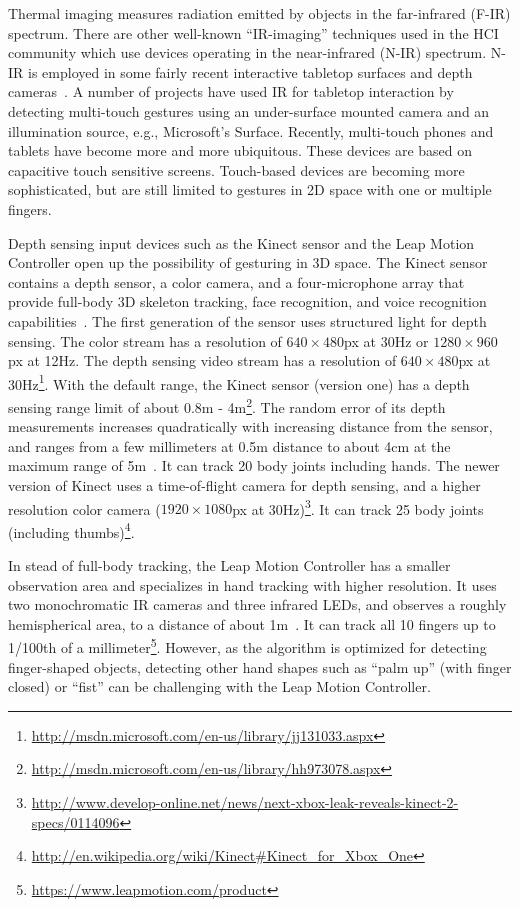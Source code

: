 Thermal imaging measures radiation emitted by objects in the
far-infrared (F-IR) spectrum. There are other well-known ``IR-imaging''
techniques used in the HCI community which use devices operating in the
near-infrared (N-IR) spectrum.
N-IR is employed in some fairly recent interactive tabletop surfaces and depth
cameras~\cite{izadi08, zhang12}. A number of projects have used
IR for tabletop interaction by detecting multi-touch gestures using an
under-surface mounted camera and an illumination source, e.g.,
Microsoft's Surface. Recently, multi-touch phones and tablets have become more
and more ubiquitous. These devices are based on capacitive touch sensitive screens. Touch-based devices are
becoming more sophisticated, but are
still limited to gestures in 2D space with one or multiple
fingers. 

Depth sensing input devices such as the Kinect sensor and the Leap Motion
Controller open up the possibility of gesturing in 3D space. The Kinect sensor
contains a depth sensor, a color camera, and a four-microphone array that
provide full-body 3D skeleton tracking, face recognition, and voice
recognition capabilities~\cite{zhang12}. The first generation of the sensor
uses structured light for depth sensing.
The color stream has a resolution of $640\times
480$px at 30Hz or $1280\times960$px at 12Hz.  The depth sensing video stream has a resolution of $640\times 480$px at
30Hz\footnote{\url{http://msdn.microsoft.com/en-us/library/jj131033.aspx}}. 
With the default range, the Kinect sensor (version one) has a depth sensing
range limit of about 0.8m -
4m\footnote{\url{http://msdn.microsoft.com/en-us/library/hh973078.aspx}}.
The random error of its depth measurements increases quadratically with
increasing distance from the sensor, and ranges from a few millimeters at 0.5m
distance to about 4cm at the maximum range of 5m~\cite{khoshelham2011}. It
can track 20 body joints including hands. The newer version of Kinect uses a
time-of-flight camera for depth sensing, and a higher resolution color camera ($1920\times 1080$px at
30Hz)\footnote{\url{http://www.develop-online.net/news/next-xbox-leak-reveals-kinect-2-specs/0114096}}.
It can track 25 body joints (including
 thumbs)\footnote{\url{http://en.wikipedia.org/wiki/Kinect\#Kinect_for_Xbox_One}}.

In stead of full-body tracking, the Leap Motion Controller has a smaller observation area and specializes in hand tracking with higher
resolution.
It uses two monochromatic IR cameras and three infrared LEDs, and observes a
roughly hemispherical area, to a distance of about 1m~\cite{leapmotion14}. It
can track all 10 fingers up to 1/100th of a
millimeter\footnote{\url{https://www.leapmotion.com/product}}. However, as
the algorithm is optimized for detecting finger-shaped objects, detecting other
hand shapes such as ``palm up'' (with finger closed) or ``fist'' can be
challenging with the Leap Motion Controller.

